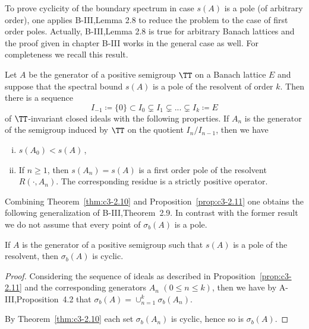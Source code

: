To prove cyclicity of the boundary spectrum in case $s(A)$ is a pole (of arbitrary order), one applies B-III,Lemma 2.8 to reduce the problem to the case of first order poles. Actually, B-III,Lemma 2.8 is true for arbitrary Banach lattices and the proof given in chapter B-III works in the general case as well. For completeness we recall this result. 

\begin{proposition}\label{prop:c3-2.11}
	Let $A$ be the generator of a positive semigroup $\TT$ on a Banach lattice $E$ and suppose that the spectral bound $s(A)$ is a pole of the resolvent of order $k$.
	Then there is a sequence
	\begin{equation}\label{eq:c3-2.22}
		I_{-1} \coloneqq \{0\} \subset I_{0} \subsetneq I_{1} \subsetneq ... \subsetneq I_{k} \coloneqq E
	\end{equation}
	of $\TT$-invariant closed ideals with the following properties.
	If $A_{n}$ is the generator of the semigroup induced by $\TT$ on the quotient $I_{n}/I_{n-1}$, then we have
	\begin{enumerate}[(i)]
		\item 	
		$s(A_{0}) < s(A)$\,,

		\item 
		If $n \geq 1$, then $s(A_{n}) = s(A)$ is a first order pole of the resolvent $R(\cdot,A_{n})$.
		The corresponding residue is a strictly positive operator.

	\end{enumerate}
\end{proposition}
%
%
Combining Theorem~\ref{thm:c3-2.10} and Proposition~\ref{prop:c3-2.11} one obtains the following generalization of B-III,Theorem~2.9.
In contrast with the former result we do not assume that every point of $\sigma_{b}(A)$ is a pole.
\begin{corollary}\label{cor:c3-2.12}
	If $A$ is the generator of a positive semigroup such that $s(A)$ is a pole of the resolvent, then $\sigma_{b}(A)$ is cyclic.
\end{corollary}

\begin{proof}
Considering the sequence of ideals as described in Proposition~\ref{prop:c3-2.11} and the corresponding generators $A_{n}$ $(0 \leq n \leq k)$, then we have by A-III,Proposition~4.2 that $\sigma_{b}(A) = \cup_{n=1}^{k} \sigma_{b}(A_{n})$.

By Theorem~\ref{thm:c3-2.10} each set $\sigma_{b}(A_{n})$ is cyclic, hence so is $\sigma_{b}(A)$.
\end{proof}

